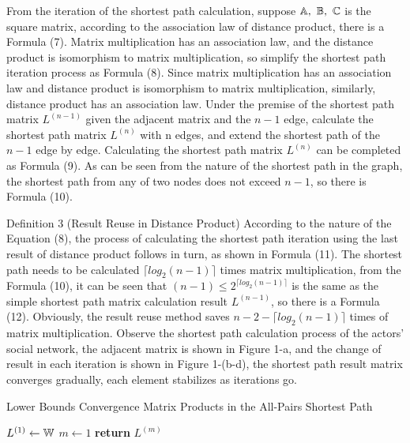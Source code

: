 \documentclass[review]{cvpr}
\begin{document}
From the iteration of the shortest path calculation, suppose \(\Bbb A,\ \Bbb B,\ \Bbb C\) is the square matrix, according to the association law of distance product, there is a Formula (7).
Matrix multiplication has an association law, and the distance product is isomorphism to matrix multiplication, so simplify the shortest path iteration process as Formula (8).
Since matrix multiplication has an association law and distance product is isomorphism to matrix multiplication, similarly, distance product has an association law.
Under the premise of the shortest path matrix $L^{(n-1)}$ given the adjacent matrix and the $n-1$ edge, calculate the shortest path matrix $L^{(n)}$ with n edges, and extend the shortest path of the $n-1$ edge by edge.
Calculating the shortest path matrix $L^{(n)}$ can be completed as Formula (9).
As can be seen from the nature of the shortest path in the graph, the shortest path from any of two nodes does not exceed $n-1$, so there is Formula (10).

Definition 3 (Result Reuse in Distance Product) According to the nature of the Equation (8), the process of calculating the shortest path iteration using the last result of distance product follows in turn, as shown in Formula (11).
The shortest path needs to be calculated $\lceil{log_2(n-1)}\rceil$ times matrix multiplication, from the Formula (10), it can be seen that $(n-1)\leq2^{\lceil{log_2(n-1)}\rceil}$ is the same as the simple shortest path matrix calculation result $L^{(n-1)}$, so there is a Formula (12).
Obviously, the result reuse method saves $n-2-\lceil{log_2(n-1)}\rceil$ times of matrix multiplication.
Observe the shortest path calculation process of the actors' social network, the adjacent matrix is shown in Figure 1-a, and the change of result in each iteration is shown in Figure 1-(b-d), the shortest path result matrix converges gradually, each element stabilizes as iterations go.


\begin{algorithm}
\caption{Lower Bounds Convergence Matrix Products in the All-Pairs Shortest Path}\label{algorithm}
  $L^{(1)}\leftarrow \Bbb W$\;
  $m\leftarrow 1$\;
  {\bf return} $L^{(m)}$\;
\end{algorithm}
\end{document}
